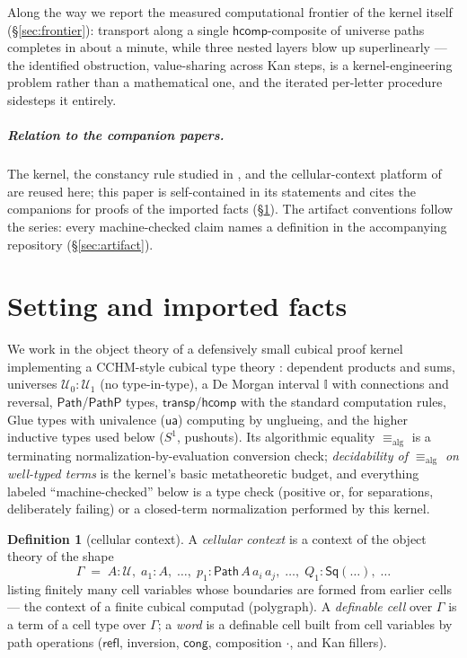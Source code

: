 \documentclass[11pt]{amsart}
\theoremstyle{definition}
\newtheorem{defi}[thm]{Definition}
\newcommand{\I}{\mathbb{I}}
\newcommand{\aconv}{\equiv_{\mathrm{alg}}}
\newcommand{\refl}{\mathsf{refl}}
\newcommand{\Path}{\mathsf{Path}}
\newcommand{\U}{\mathcal{U}}
\newcommand{\hcomp}{\mathsf{hcomp}}
\newcommand{\ua}{\mathsf{ua}}
\newcommand{\transp}{\mathsf{transp}}
\newcommand{\cng}{\mathsf{cong}}
\newcommand{\trns}{\mathbin{\cdot}}
\newcommand{\Sone}{S^1}
\begin{document}
Along the way we report the measured computational frontier of the
kernel itself (\S\ref{sec:frontier}): transport along a single
$\hcomp$-composite of universe paths completes in about a minute,
while three nested layers blow up superlinearly --- the identified
obstruction, value-sharing across Kan steps, is a kernel-engineering
problem rather than a mathematical one, and the iterated per-letter
procedure sidesteps it entirely.

\subparagraph*{Relation to the companion papers.}  The kernel, the
constancy rule studied in \cite{Const}, and the cellular-context
platform of \cite{Sphere,Realization,Convexity} are reused here;
this paper is self-contained in its statements and cites the
companions for proofs of the imported facts
(\S\ref{sec:setting}).  The artifact conventions follow the series:
every machine-checked claim names a definition in the accompanying
repository (\S\ref{sec:artifact}).

\section{Setting and imported facts}
\label{sec:setting}

We work in the object theory of a defensively small cubical proof
kernel implementing a CCHM-style cubical type theory
\cite{CCHM}: dependent products and sums, universes
$\U_0 : \U_1$ (no type-in-type), a De Morgan interval $\I$ with
connections and reversal, $\Path$/$\mathsf{PathP}$ types,
$\transp$/$\hcomp$ with the standard computation rules, Glue types
with univalence ($\ua$) computing by unglueing, and the higher
inductive types used below ($\Sone$, pushouts).  Its algorithmic
equality $\aconv$ is a terminating normalization-by-evaluation
conversion check; \emph{decidability of $\aconv$ on well-typed
terms} is the kernel's basic metatheoretic budget, and everything
labeled ``machine-checked'' below is a type check (positive or, for
separations, deliberately failing) or a closed-term normalization
performed by this kernel.

\begin{defi}[cellular context]
  A \emph{cellular context} is a context of the object theory of
  the shape
  \[
    \Gamma \;=\; A : \U,\; a_1 : A,\; \dots,\;
    p_1 : \Path\,A\,a_i\,a_j,\; \dots,\;
    Q_1 : \mathsf{Sq}(\dots),\; \dots
  \]
  listing finitely many cell variables whose boundaries are formed
  from earlier cells --- the context of a finite cubical computad
  (polygraph).  A \emph{definable cell} over $\Gamma$ is a term of a
  cell type over $\Gamma$; a \emph{word} is a definable cell built
  from cell variables by path operations
  ($\refl$, inversion, $\cng$, composition $\trns$, and Kan
  fillers).
\end{defi}
\end{document}
